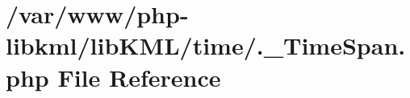 \hypertarget{_8__TimeSpan_8php}{
\section{/var/www/php-\/libkml/libKML/time/.\_\-TimeSpan.php File Reference}
\label{d4/d56/_8__TimeSpan_8php}
}
